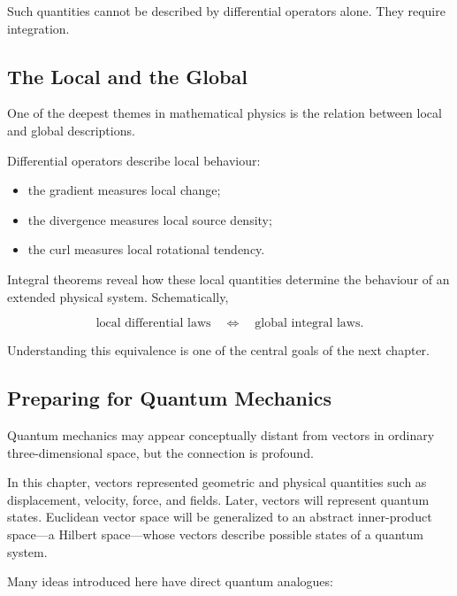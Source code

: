 Such quantities cannot be described by differential operators alone. They
require integration.

\subsection{The Local and the Global}

One of the deepest themes in mathematical physics is the relation between local
and global descriptions.

Differential operators describe local behaviour:

\begin{itemize}
\item the gradient measures local change;
\item the divergence measures local source density;
\item the curl measures local rotational tendency.
\end{itemize}

Integral theorems reveal how these local quantities determine the behaviour of
an extended physical system. Schematically,

\[
\boxed{
\text{local differential laws}
\quad\Longleftrightarrow\quad
\text{global integral laws}.
}
\]

Understanding this equivalence is one of the central goals of the next chapter.

\subsection{Preparing for Quantum Mechanics}

Quantum mechanics may appear conceptually distant from vectors in ordinary
three-dimensional space, but the connection is profound.

In this chapter, vectors represented geometric and physical quantities such as
displacement, velocity, force, and fields. Later, vectors will represent
quantum states. Euclidean vector space will be generalized to an abstract
inner-product space---a Hilbert space---whose vectors describe possible states
of a quantum system.

Many ideas introduced here have direct quantum analogues:

